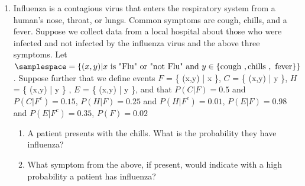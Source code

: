 \documentclass[krantz1,ChapterTOCs]{krantz}
\begin{document}
\begin{enumerate}
   \item Influenza is a contagious virus that enters the respiratory system from a human's nose, throat, or lungs. Common symptoms are cough, chills, and a fever.
   Suppose we collect data from a local hospital about those who were infected and not infected by the influenza virus and the above three symptoms. Let $\samplespace = \{ (x,y)  | x \text{ is } \text{"Flu"} \text{ or } \text{"not Flu"} \text{ and } y \in \{ \text{cough },\text{chills },\text{ fever} \}   \}$. 
   Suppose further that we define events $F$ = \{ (x,y)  | x   \}, $C$ = \{ (x,y)  | y   \}, $H$ = \{ (x,y)  | y   \} , $E$ = \{ (x,y)  | y   \}, and that $P( C|F ) = 0.5$ and $P( C|F^{c} ) = 0.15$, $P( H|F ) = 0.25$ and $P( H|F^{c} ) = 0.01$, $P( E|F ) = 0.98$ and $P( E|F^{c} ) = 0.35$, $P(F) = 0.02$  
    \begin{enumerate}
       \item A patient presents with the chills. What is the probability they have influenza? 
       \item What symptom from the above, if present, would indicate with a high probability a patient has influenza?
    \end{enumerate}
 
            
        
   \end{enumerate}
    
\end{document}
